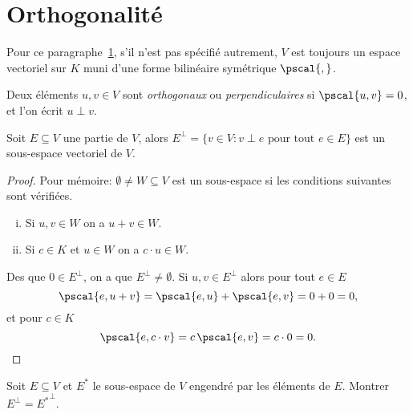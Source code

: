 \section{Orthogonalité} 
\label{sec:orthogonalite}

\begin{framed}\noindent 
  Pour ce paragraphe~\ref{sec:orthogonalite}, s'il n'est pas spécifié autrement,  $V$
  est toujours un espace vectoriel sur $K$
  muni d'une forme bilinéaire symétrique $\pscal{,}$. 
\end{framed}



\begin{definition}
  \label{def:2}
 Deux éléments $u,v \in V$ sont \emph{orthogonaux} ou \emph{perpendiculaires} si $\pscal{u,v} = 0$, et l'on écrit $u \perp v$. 
\end{definition}

\begin{proposition}
  \label{prop:1}
  Soit $E \subseteq V$ une partie de $V$, alors $E^\perp = \{ v \in V \colon v \perp e \text{ pour tout } e \in E \}$   est un sous-espace vectoriel de $V$. 
\end{proposition}

\begin{proof}
  Pour mémoire: $\emptyset \neq W\subseteq V$ est un sous-espace si les conditions suivantes sont vérifiées. 
  \begin{enumerate}[i)]
  \item Si $u,v \in W$ on a $u+v \in W$.  
  \item Si $c \in K$ et $u \in W$ on a $c \cdot u \in W$. 
  \end{enumerate}
  
  \noindent
  Des que $0 ∈ E^\perp  $, on a que $E^\perp≠ ∅$.  %
  Si $u,v \in E^\perp$ alors pour tout $e \in E$ 
  \begin{displaymath}
    \pscal{e,u+v} = \pscal{e,u} + \pscal{e,v} = 0 + 0 = 0,
  \end{displaymath}  
  et pour $c \in K$ 
  \begin{displaymath}
    \pscal{e,c\cdot v} = c \,\pscal{e,v} = c \cdot 0 = 0. 
  \end{displaymath}
\end{proof}



\begin{exercise}
  \label{exe:1}
  Soit $E \subseteq V$ et $E^*$ le sous-espace de $V$ engendré par les éléments de $E$. Montrer $E^\perp = {E^*}^\perp$. 
\end{exercise}


